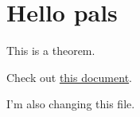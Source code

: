 \documentclass[reqno]{amsart} 
\begin{document}
\section{Hello pals}


\begin{theorem}\label{theorem:d1bd91cb750b}
This is a theorem.
\end{theorem}

Check out \href{20230612T124951__i-dont-know-trial-okay.pdf}{this document}.

I'm also changing this file.

{} 
\end{document}
